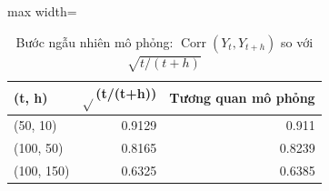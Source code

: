 \begin{table}[H]
\centering\small
\caption{Bước ngẫu nhiên mô phỏng: $\operatorname{Corr}(Y_t,Y_{t+h})$ so với $\sqrt{t/(t+h)}$}\label{tab:tab_b12_02_rw_correlation}
\begin{adjustbox}{max width=\linewidth}
\begin{tabular}{lrr}
\toprule
(t, h) & $\sqrt{}$(t/(t+h)) & Tương quan mô phỏng \\
\midrule
(50, 10) & 0.9129 & 0.911 \\
(100, 50) & 0.8165 & 0.8239 \\
(100, 150) & 0.6325 & 0.6385 \\
\bottomrule
\end{tabular}
\end{adjustbox}
\end{table}
